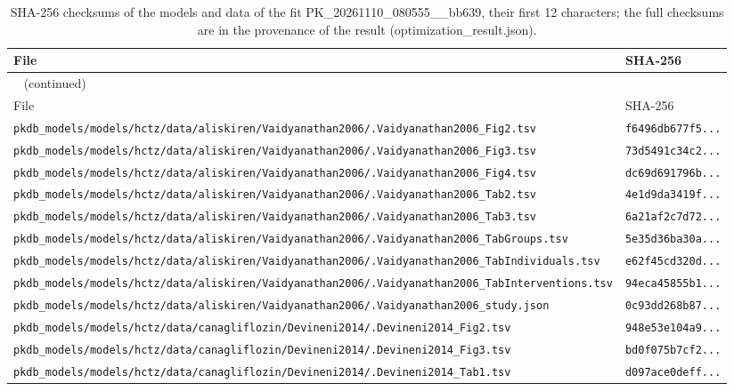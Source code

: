 \documentclass{article}
\begin{document}
\begin{longtable}{ll}
\caption{SHA-256 checksums of the models and data of the fit PK\_20261110\_080555\_\_bb639, their first 12 characters; the full checksums are in the provenance of the result (optimization\_result.json).}\label{tab:checksums:PK_20261110_080555__bb639} \\
\toprule
File & SHA-256 \\
\midrule
\endfirsthead
\multicolumn{2}{l}{\small\tablename~\thetable{} (continued)} \\
\toprule
File & SHA-256 \\
\midrule
\endhead
\bottomrule
\endlastfoot
\texttt{pkdb\_models/models/hctz/data/aliskiren/Vaidyanathan2006/.Vaidyanathan2006\_Fig2.tsv} & \texttt{f6496db677f5...} \\
\texttt{pkdb\_models/models/hctz/data/aliskiren/Vaidyanathan2006/.Vaidyanathan2006\_Fig3.tsv} & \texttt{73d5491c34c2...} \\
\texttt{pkdb\_models/models/hctz/data/aliskiren/Vaidyanathan2006/.Vaidyanathan2006\_Fig4.tsv} & \texttt{dc69d691796b...} \\
\texttt{pkdb\_models/models/hctz/data/aliskiren/Vaidyanathan2006/.Vaidyanathan2006\_Tab2.tsv} & \texttt{4e1d9da3419f...} \\
\texttt{pkdb\_models/models/hctz/data/aliskiren/Vaidyanathan2006/.Vaidyanathan2006\_Tab3.tsv} & \texttt{6a21af2c7d72...} \\
\texttt{pkdb\_models/models/hctz/data/aliskiren/Vaidyanathan2006/.Vaidyanathan2006\_TabGroups.tsv} & \texttt{5e35d36ba30a...} \\
\texttt{pkdb\_models/models/hctz/data/aliskiren/Vaidyanathan2006/.Vaidyanathan2006\_TabIndividuals.tsv} & \texttt{e62f45cd320d...} \\
\texttt{pkdb\_models/models/hctz/data/aliskiren/Vaidyanathan2006/.Vaidyanathan2006\_TabInterventions.tsv} & \texttt{94eca45855b1...} \\
\texttt{pkdb\_models/models/hctz/data/aliskiren/Vaidyanathan2006/.Vaidyanathan2006\_study.json} & \texttt{0c93dd268b87...} \\
\texttt{pkdb\_models/models/hctz/data/canagliflozin/Devineni2014/.Devineni2014\_Fig2.tsv} & \texttt{948e53e104a9...} \\
\texttt{pkdb\_models/models/hctz/data/canagliflozin/Devineni2014/.Devineni2014\_Fig3.tsv} & \texttt{bd0f075b7cf2...} \\
\texttt{pkdb\_models/models/hctz/data/canagliflozin/Devineni2014/.Devineni2014\_Tab1.tsv} & \texttt{d097ace0deff...} \\

\end{longtable}
\end{document}
